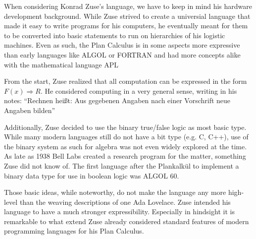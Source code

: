 \documentclass{llncs}
\begin{document}
   When considering Konrad Zuse's language, we have to keep 
   in mind his hardware development background. While Zuse strived 
   to create a universial language that made it easy to write 
   programs for his computers, he eventually meant for them to
   be converted into basic statements to run on hierarchies of 
   his logistic machines. Even as such, the Plan Calculus is in some aspects more
   expressive than early languages like ALGOL or FORTRAN and had more 
   concepts alike with the mathematical language APL\cite{giloi2002konrad}
   
   From the start, Zuse realized that all computation can be expressed 
   in the form $F(x) \Rightarrow R$. He considered computing in a very 
   general sense, writing in his notes: ``Rechnen heißt: Aus
   gegebenen Angaben nach einer Vorschrift neue Angaben bilden''\cite{bauer1972plankalkuel}

   Additionally, Zuse decided to use the binary 
   true/false logic as most basic type. While many modern languages still 
   do not have a bit type (e.g. C, C++), use of the binary system as such 
   for algebra was not even widely explored at the time. As late as 1938 Bell Labs created a 
   research program for the matter, something Zuse did not know of. The first 
   language after the Plankalkül to implement a binary data type for use in 
   boolean logic was ALGOL 60.
   
   Those basic ideas, while noteworthy, do not make the language any more
   high-level than the weaving descriptions of one Ada Lovelace. 
   Zuse intended his language to have a much stronger expressibility. 
   Especially in hindsight it is remarkable 
   to what extend Zuse already considered standard features of modern 
   programming languages for his Plan Calculus.
   
\end{document}
